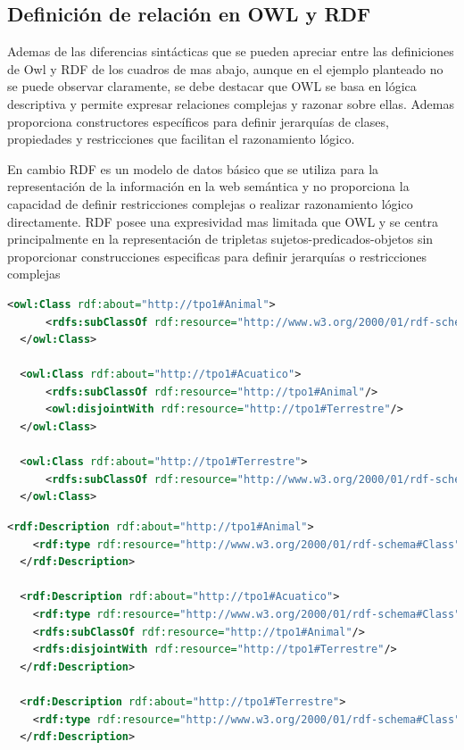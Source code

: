 \subsection{Definición de relación en OWL y RDF}
Ademas de las diferencias sintácticas que se pueden apreciar entre las definiciones de Owl y RDF de los cuadros de mas abajo, aunque en el ejemplo planteado no se puede observar claramente, se debe destacar que OWL se basa en lógica descriptiva y permite expresar relaciones complejas y razonar sobre ellas. Ademas proporciona constructores específicos para definir jerarquías de clases, propiedades y restricciones que facilitan el razonamiento lógico.

En cambio RDF es un modelo de datos básico que se utiliza para la representación de la información
en la web semántica y no proporciona la capacidad de definir restricciones complejas o realizar razonamiento lógico directamente. RDF posee una expresividad mas limitada que OWL y se centra principalmente en la representación de tripletas sujetos-predicados-objetos sin proporcionar construcciones especificas para definir jerarquías o restricciones complejas
\begin{tcolorbox}[title=Definición en RDF de ``Acuatico'' subclase de ``Animal'' y disjunto con ``Terrestre'']
\begin{lstlisting}[language=XML, breaklines=true]
  <owl:Class rdf:about="http://tpo1#Animal">
      <rdfs:subClassOf rdf:resource="http://www.w3.org/2000/01/rdf-schema#Class"/>
  </owl:Class>
  
  <owl:Class rdf:about="http://tpo1#Acuatico">
      <rdfs:subClassOf rdf:resource="http://tpo1#Animal"/>
      <owl:disjointWith rdf:resource="http://tpo1#Terrestre"/>
  </owl:Class>
  
  <owl:Class rdf:about="http://tpo1#Terrestre">
      <rdfs:subClassOf rdf:resource="http://www.w3.org/2000/01/rdf-schema#Class"/>
  </owl:Class>
\end{lstlisting}
\end{tcolorbox}

\begin{tcolorbox}[title=Definición en RDF de ``Acuatico'' subclase de ``Animal'' y disjunto con ``Terrestre'']
  \begin{lstlisting}[language=XML, breaklines=true]
  <rdf:Description rdf:about="http://tpo1#Animal">
    <rdf:type rdf:resource="http://www.w3.org/2000/01/rdf-schema#Class"/>
  </rdf:Description>

  <rdf:Description rdf:about="http://tpo1#Acuatico">
    <rdf:type rdf:resource="http://www.w3.org/2000/01/rdf-schema#Class"/>
    <rdfs:subClassOf rdf:resource="http://tpo1#Animal"/>
    <rdfs:disjointWith rdf:resource="http://tpo1#Terrestre"/>
  </rdf:Description>

  <rdf:Description rdf:about="http://tpo1#Terrestre">
    <rdf:type rdf:resource="http://www.w3.org/2000/01/rdf-schema#Class"/>
  </rdf:Description>

  \end{lstlisting}
  \end{tcolorbox}

